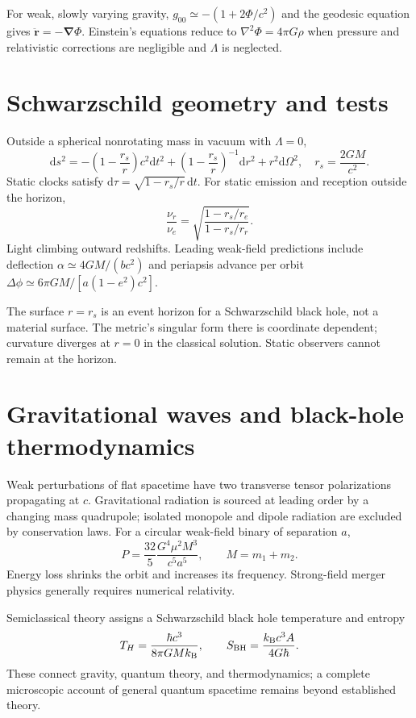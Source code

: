 \documentclass[11pt,oneside]{book}
\newcommand{\dd}{\mathrm{d}}
\newcommand{\vect}[1]{\boldsymbol{#1}}
\newcommand{\grad}{\boldsymbol{\nabla}}
\newcommand{\lap}{\nabla^2}
\newcommand{\kb}{k_{\mathrm B}}
\theoremstyle{reviewstyle}
\begin{document}
For weak, slowly varying gravity, $g_{00}\simeq-(1+2\Phi/c^2)$ and the geodesic equation gives $\ddot{\vect r}=-\grad\Phi$. Einstein's equations reduce to $\lap\Phi=4\pi G\rho$ when pressure and relativistic corrections are negligible and $\Lambda$ is neglected.
\section{Schwarzschild geometry and tests}
Outside a spherical nonrotating mass in vacuum with $\Lambda=0$,
\begin{equation}
\dd s^2=-\left(1-\frac{r_s}{r}\right)c^2\dd t^2+
\left(1-\frac{r_s}{r}\right)^{-1}\dd r^2+r^2\dd\Omega^2,\quad r_s=\frac{2GM}{c^2}.
\end{equation}
Static clocks satisfy $\dd\tau=\sqrt{1-r_s/r}\,\dd t$. For static emission and reception outside the horizon,
\begin{equation}\frac{\nu_r}{\nu_e}=\sqrt{\frac{1-r_s/r_e}{1-r_s/r_r}}.\end{equation}
Light climbing outward redshifts. Leading weak-field predictions include deflection $\alpha\simeq4GM/(bc^2)$ and periapsis advance per orbit
$\Delta\phi\simeq6\pi GM/[a(1-e^2)c^2]$.

The surface $r=r_s$ is an event horizon for a Schwarzschild black hole, not a material surface. The metric's singular form there is coordinate dependent; curvature diverges at $r=0$ in the classical solution. Static observers cannot remain at the horizon.
\section{Gravitational waves and black-hole thermodynamics}
Weak perturbations of flat spacetime have two transverse tensor polarizations propagating at $c$. Gravitational radiation is sourced at leading order by a changing mass quadrupole; isolated monopole and dipole radiation are excluded by conservation laws. For a circular weak-field binary of separation $a$,
\begin{equation}P=\frac{32}{5}\frac{G^4\mu^2M^3}{c^5a^5},\qquad M=m_1+m_2.\end{equation}
Energy loss shrinks the orbit and increases its frequency. Strong-field merger physics generally requires numerical relativity.

Semiclassical theory assigns a Schwarzschild black hole temperature and entropy
\begin{equation}T_H=\frac{\hbar c^3}{8\pi G M\kb},\qquad S_{\rm BH}=\frac{\kb c^3A}{4G\hbar}.\end{equation}
These connect gravity, quantum theory, and thermodynamics; a complete microscopic account of general quantum spacetime remains beyond established theory.
\end{document}

